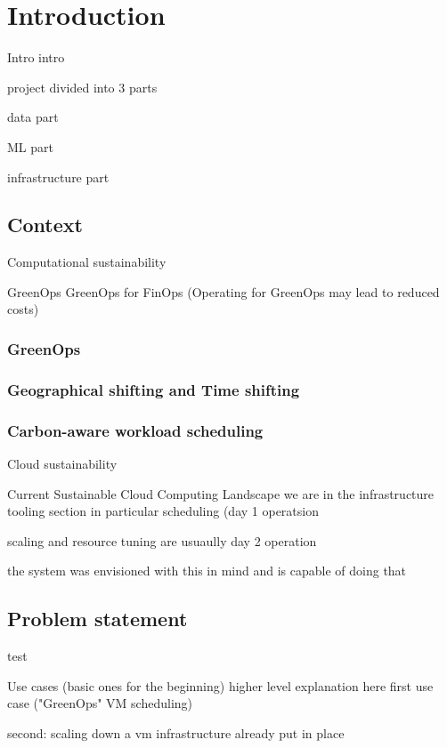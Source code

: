 \chapter{Introduction}
\label{cha:introduction}

Intro intro

project divided into 3 parts

data part

ML part

infrastructure part

\section{Context}
\label{sec:context}

Computational sustainability

GreenOps
GreenOps for FinOps
(Operating for GreenOps may lead to reduced costs)

\subsection{GreenOps}
\subsection{Geographical shifting and Time shifting}
\subsection{Carbon-aware workload scheduling}


Cloud sustainability

Current Sustainable Cloud Computing Landscape
we are in the infrastructure tooling section
in particular scheduling (day 1 operatsion

scaling and resource tuning are usuaully day 2 operation

the system was envisioned with this in mind and is capable of doing that

\section{Problem statement}
\label{sec:problem}

test


Use cases (basic ones for the beginning) higher level explanation here
first use case ("GreenOps" VM scheduling)

second: scaling down a vm 
infrastructure already put in place

